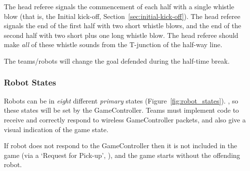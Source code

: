 
The head referee signals the commencement of each half with a single whistle blow (that is, the Initial kick-off, \cf Section~\ref{sec:initial-kick-off}).
The head referee signals the end of the first half with two short whistle blows, and the end of the second half with two short plus one long whistle blow.
The head referee should make \textit{all} of these whistle sounds from the T-junction of the half-way line.

The teams/robots will change the goal defended during the half-time break.

\subsubsection{Robot States}
\label{sec:robot_states}

Robots can be in \textit{eight} different \emph{primary} states (\cf Figure~\ref{fig:robot_states}). , so these states will be set by the GameController. Teams must implement code to receive and correctly respond to wireless GameController packets, and also give a visual indication of the game state.


If  robot does not respond to the GameController then it is not included in the game (via a `Request for Pick-up', ), and the game starts without the offending robot.

